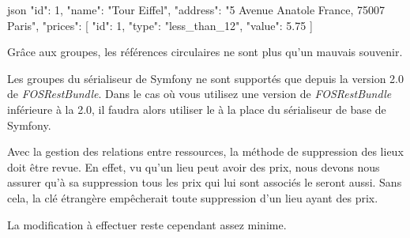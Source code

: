 \documentclass[big]{zmdocument}
\begin{document}
\begin{CodeBlock}{json}
{
  "id": 1,
  "name": "Tour Eiffel",
  "address": "5 Avenue Anatole France, 75007 Paris",
  "prices": [
    {
      "id": 1,
      "type": "less_than_12",
      "value": 5.75
    }
  ]
}
\end{CodeBlock}



Grâce aux groupes, les références circulaires ne sont plus qu'un mauvais souvenir.



\begin{Warning}
Les groupes du sérialiseur de Symfony ne sont supportés que depuis la version 2.0 de \textit{FOSRestBundle}. Dans le cas où vous utilisez une version de \textit{FOSRestBundle} inférieure à la 2.0, il faudra alors utiliser le  à la place du sérialiseur de base de Symfony.
\end{Warning}




Avec la gestion des relations entre ressources, la méthode de suppression des lieux doit être revue. En effet, vu qu'un lieu peut avoir des prix, nous devons nous assurer qu'à sa suppression tous les prix qui lui sont associés le seront aussi. Sans cela, la clé étrangère empêcherait toute suppression d'un lieu ayant des prix.



La modification à effectuer reste cependant assez minime.



\end{document}
